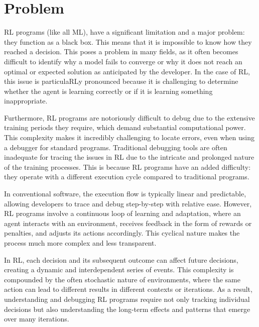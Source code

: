 
\chapter{Problem}
\label{cha:problem}

\ac{RL} programs (like all \ac{ML}), 
have a significant limitation and a major problem: they function as a black box. 
This means that it is impossible to know how they reached a decision. This poses 
a problem in many fields, as it often becomes difficult to identify why a model 
fails to converge or why it does not reach an optimal or expected solution as 
anticipated by the developer. In the case of \ac{RL}, this issue is particula\ac{RL}y 
pronounced because it is challenging to determine whether the agent is learning 
correctly or if it is learning something inappropriate.

Furthermore, \ac{RL} programs are notoriously difficult to debug due to the extensive 
training periods they require, which demand substantial computational power. This 
complexity makes it incredibly challenging to locate errors, even when using a 
debugger for standard programs. Traditional debugging tools are often inadequate 
for tracing the issues in \ac{RL} due to the intricate and prolonged nature of the 
training processes. This is because \ac{RL} programs have an added difficulty: they 
operate with a different execution cycle compared to traditional programs.

In conventional software, the execution flow is typically linear and predictable, 
allowing developers to trace and debug step-by-step with relative ease. However, 
\ac{RL} programs involve a continuous loop of learning and adaptation, where an agent 
interacts with an environment, receives feedback in the form of rewards or 
penalties, and adjusts its actions accordingly. This cyclical nature makes the 
process much more complex and less transparent.

In \ac{RL}, each decision and its subsequent outcome can affect future decisions, 
creating a dynamic and interdependent series of events. This complexity is 
compounded by the often stochastic nature of environments, where the same action 
can lead to different results in different contexts or iterations. As a result, 
understanding and debugging \ac{RL} programs require not only tracking individual 
decisions but also understanding the long-term effects and patterns that emerge 
over many iterations.

